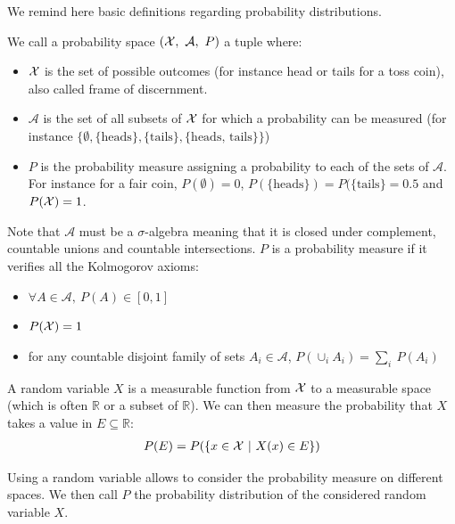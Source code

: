 We remind here basic definitions regarding probability distributions.
\begin{definition}\label{def:probability_space}
    We call a probability space $({\mathcal{X}},~\mathcal{A},~P)$ a tuple where:
    \begin{itemize}
        \item ${\mathcal{X}}$ is the set of possible outcomes (for instance head or tails for a toss coin), also called frame of discernment.
        \item $\mathcal{A}$ is the set of all subsets of ${\mathcal{X}}$ for which a probability can be measured (for instance $\{\emptyset, \{\text{heads}\}, \{\text{tails}\}, \{\text{heads, tails}\}\}$)
        \item $P$ is the probability measure assigning a probability to each of the sets of $\mathcal{A}$. For instance for a fair coin, $P(\emptyset)=0$, $P(\{\text{heads}\})=P(\{\text{tails}\}=0.5$ and $P({\mathcal{X}})=1$.
    \end{itemize}
    Note that $\mathcal{A}$ must be a $\sigma$-algebra meaning that it is closed under complement, countable unions and countable intersections. $P$ is a probability measure if it verifies all the Kolmogorov axioms:
    \begin{itemize}
        \item $\forall A\in\mathcal{A},~P(A)\in[0,1]$
        \item $P({\mathcal{X}}) = 1$
        \item for any countable disjoint family of sets $A_i\in\mathcal{A}$, $P(\cup_i A_i)=\sum_i~P(A_i)$
    \end{itemize}
\end{definition}

\begin{definition}
    A random variable $X$ is a measurable function from ${\mathcal{X}}$ to a measurable space (which is often $\mathbb{R}$ or a subset of $\mathbb{R}$). We can then measure the probability that $X$ takes a value in $E\subseteq\mathbb{R}$:
    \begin{align*}
        P(E) = P(\{x\in{\mathcal{X}}~|~X(x)\in E\})
    \end{align*}
\end{definition}

Using a random variable allows to consider the probability measure on different spaces. We then call $P$ the probability distribution of the considered random variable $X$.

